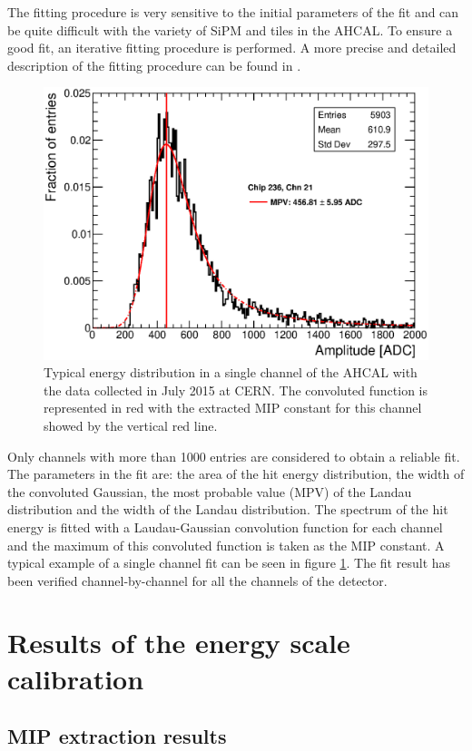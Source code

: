 The fitting procedure is very sensitive to the initial parameters of the fit and can be quite difficult with the variety of SiPM and tiles in the AHCAL. To ensure a good fit, an iterative fitting procedure is performed. A more precise and detailed description of the fitting procedure can be found in \cite{FabianThesis, SarahMaster}.

\begin{figure}[htbp!]
	\centering
	\includegraphics[width=0.6\linewidth]{../Thesis_Plots/EnergyCalib/Plots/ExampleMIP_Module3.eps}
	\caption{Typical energy distribution in a single channel of the AHCAL with the data collected in July 2015 at CERN. The convoluted function is represented in red with the extracted MIP constant for this channel showed by the vertical red line.} \label{fig:MIPFit}
\end{figure}

Only channels with more than 1000 entries are considered to obtain a reliable fit. The parameters in the fit are: the area of the hit energy distribution, the width of the convoluted Gaussian, the most probable value (MPV) of the Landau distribution and the width of the Landau distribution. The spectrum of the hit energy is fitted with a Laudau-Gaussian convolution function for each channel and the maximum of this convoluted function is taken as the MIP constant. A typical example of a single channel fit can be seen in figure \ref{fig:MIPFit}. The fit result has been verified channel-by-channel for all the channels of the detector.

\section{Results of the energy scale calibration}

\subsection{MIP extraction results}

